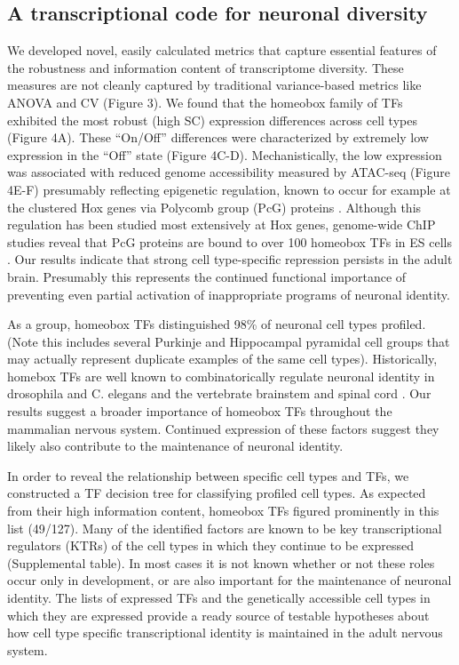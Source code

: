 \subsection{A transcriptional code for neuronal diversity}
We developed novel, easily calculated metrics that capture essential features of the robustness and information content of transcriptome diversity. These measures are not cleanly captured by traditional variance-based metrics like ANOVA and CV (Figure 3). We found that the homeobox family of TFs exhibited the most robust (high SC) expression differences across cell types (Figure 4A). These “On/Off” differences were characterized by extremely low expression in the “Off” state (Figure 4C-D). Mechanistically, the low expression was associated with reduced genome accessibility measured by ATAC-seq (Figure 4E-F) presumably reflecting epigenetic regulation, known to occur for example at the clustered Hox genes via Polycomb group (PcG) proteins \cite{Montavon_2014}. Although this regulation has been studied most extensively at Hox genes, genome-wide ChIP studies reveal that PcG proteins are bound to over 100 homeobox TFs in ES cells \cite{Boyer_2006}. Our results indicate that strong cell type-specific repression persists in the adult brain. Presumably this represents the continued functional importance of preventing even partial activation of inappropriate programs of neuronal identity. 

As a group, homeobox TFs distinguished 98\% of neuronal cell types profiled. (Note this includes several Purkinje and Hippocampal pyramidal cell groups that may actually represent duplicate examples of the same cell types). Historically, homebox TFs are well known to combinatorically regulate neuronal identity in drosophila and C. elegans \cite{Kratsios_2017} and the vertebrate brainstem and spinal cord \cite{Dasen_2009,Philippidou_2013}. Our results suggest a broader importance of homeobox TFs throughout the mammalian nervous system. Continued expression of these factors suggest they likely also contribute to the maintenance of neuronal identity.

In order to reveal the relationship between specific cell types and TFs, we constructed a TF decision tree for classifying profiled cell types. As expected from their high information content, homeobox TFs figured prominently in this list (49/127). Many of the identified factors are known to be key transcriptional regulators (KTRs) of the cell types in which they continue to be expressed (Supplemental table). In most cases it is not known whether or not these roles occur only in development, or are also important for the maintenance of neuronal identity. The lists of expressed TFs and the genetically accessible cell types in which they are expressed provide a ready source of testable hypotheses about how cell type specific transcriptional identity is maintained in the adult nervous system.


